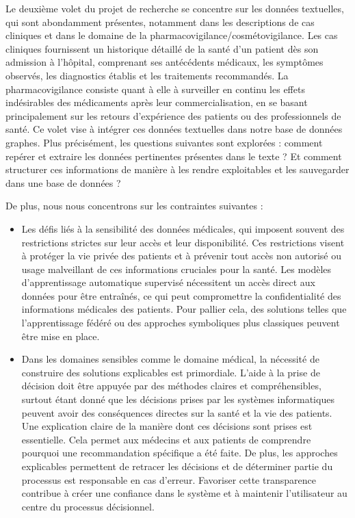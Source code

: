 Le deuxième volet du projet de recherche se concentre sur les données textuelles, qui sont abondamment présentes, notamment dans les descriptions de cas cliniques et dans le domaine de la pharmacovigilance/cosmétovigilance.
Les cas cliniques fournissent un historique détaillé de la santé d'un patient dès son admission à l'hôpital, comprenant ses antécédents médicaux, les symptômes observés, les diagnostics établis et les traitements recommandés.
La pharmacovigilance consiste quant à elle à surveiller en continu les effets indésirables des médicaments après leur commercialisation, en se basant principalement sur les retours d'expérience des patients ou des professionnels de santé.
Ce volet vise à intégrer ces données textuelles dans notre base de données graphes.
Plus précisément, les questions suivantes sont explorées : comment repérer et extraire les données pertinentes présentes dans le texte ? Et comment structurer ces informations de manière à les rendre exploitables et les sauvegarder dans une base de données ?

De plus, nous nous concentrons sur les contraintes suivantes :
\begin{itemize}
    \item Les défis liés à la sensibilité des données médicales, qui imposent souvent des restrictions strictes sur leur accès et leur disponibilité.
    Ces restrictions visent à protéger la vie privée des patients et à prévenir tout accès non autorisé ou usage malveillant de ces informations cruciales pour la santé.
    Les modèles d'apprentissage automatique supervisé nécessitent un accès direct aux données pour être entraînés, ce qui peut compromettre la confidentialité des informations médicales des patients.
    Pour pallier cela, des solutions telles que l'apprentissage fédéré ou des approches symboliques plus classiques peuvent être mise en place.

    \item Dans les domaines sensibles comme le domaine médical, la nécessité de construire des solutions explicables est primordiale.
    L'aide à la prise de décision doit être appuyée par des méthodes claires et compréhensibles, surtout étant donné que les décisions prises par les systèmes informatiques peuvent avoir des conséquences directes sur la santé et la vie des patients.
    Une explication claire de la manière dont ces décisions sont prises est essentielle.
    Cela permet aux médecins et aux patients de comprendre pourquoi une recommandation spécifique a été faite.
    De plus, les approches explicables permettent de retracer les décisions et de déterminer partie du processus est responsable en cas d'erreur.
    Favoriser cette transparence contribue à créer une confiance dans le système et à maintenir l'utilisateur au centre du processus décisionnel.
\end{itemize}

